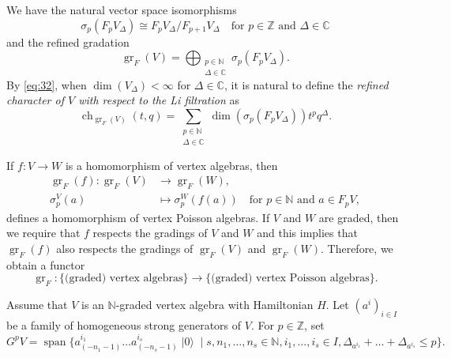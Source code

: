 \documentclass[a4paper, 12pt, reqno]{amsart}
\theoremstyle{remark}
\numberwithin{equation}{subsection}
\DeclareMathOperator{\gr}{gr}
\DeclareMathOperator{\ch}{ch}
\DeclareMathOperator{\vspan}{span}
\DeclareMathOperator{\vac}{|0\rangle}
\begin{document}
We have the natural vector space isomorphisms
\begin{equation*}
  \sigma_p(F_pV_{\Delta}) \cong F_pV_{\Delta}/F_{p + 1}V_{\Delta} \quad \text{for }p \in \mathbb{Z}\text{ and }\Delta \in \mathbb{C}
\end{equation*}
and the refined gradation
\begin{equation}
  \label{eq:32}
  \gr_F(V) = \bigoplus_{\substack{p \in \mathbb{N} \\ \Delta \in \mathbb{C}}}\sigma_p(F_pV_{\Delta}).
\end{equation}
By \eqref{eq:32}, when $\dim(V_{\Delta}) < \infty$ for $\Delta \in \mathbb{C}$, it is natural to define the \emph{refined character of $V$ with respect to the Li filtration} as
\begin{equation*}
  \ch_{\gr_F(V)}(t, q) = \sum_{\substack{p \in \mathbb{N} \\ \Delta \in \mathbb{C}}}\dim(\sigma_p(F_pV_{\Delta}))t^pq^{\Delta}.
\end{equation*}

If $f: V \to W$ is a homomorphism of vertex algebras, then
\begin{align*}
  \gr_F(f): \gr_F(V) &\to \gr_F(W), \\
  \sigma^V_p(a) &\mapsto \sigma^W_p(f(a)) \quad \text{for }p \in \mathbb{N}\text{ and }a \in F_pV,
\end{align*}
defines a homomorphism of vertex Poisson algebras.
If $V$ and $W$ are graded, then we require that $f$ respects the gradings of $V$ and $W$ and this implies that $\gr_F(f)$ also respects the gradings of $\gr_F(V)$ and $\gr_F(W)$.
Therefore, we obtain a functor
\begin{equation*}
  \gr_F: \{\text{(graded) vertex algebras}\} \to \{\text{(graded) vertex Poisson algebras}\}.
\end{equation*}

Assume that $V$ is an $\mathbb{N}$-graded vertex algebra with Hamiltonian $H$.
Let $(a^i)_{i \in I}$ be a family of homogeneous strong generators of $V$.
For $p \in \mathbb{Z}$, set
\begin{equation*}
  G^pV = \vspan\{a^{i_1}_{(-n_1 - 1)}\dots a^{i_s}_{(-n_s - 1)}\vac \mid s, n_1, \dots, n_s \in \mathbb{N}, i_1, \dots, i_s \in I, \Delta_{a^{i_1}} + \dots + \Delta_{a^{i_s}} \le p\}.
\end{equation*}
\end{document}
